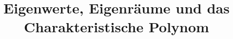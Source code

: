 \documentclass[12pt]{article}
\begin{document}
    \title{Eigenwerte, Eigenräume und das Charakteristische Polynom}
    \maketitle
    
    
    
    
\end{document}
